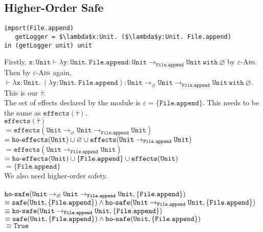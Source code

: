 \documentclass{llncs}
\newcommand{\keywadj}[1]{\mathtt{#1}}
\newcommand{\keyw}[1]{\keywadj{#1}~}
\newcommand{\kw}[1]{\keyw{ #1 }}
\newcommand{\kwa}[1]{\keywadj{ #1 }}
\newcommand{\hyphen}{\hbox{-}}
\newcommand{\Unit}[0]{ \kwa{Unit} }
\begin{document}
\subsection{Higher-Order Safe}
\begin{lstlisting}
import(File.append)
   getLogger = $\lambda$x:Unit. ($\lambda$y:Unit. File.append)
in (getLogger unit) unit
\end{lstlisting}

\noindent
Firstly, $\kwa{x:Unit \vdash \lambda y:Unit .~File.append : \Unit \rightarrow_{File.append} \Unit ~with ~ \varnothing} $ by \textsc{$\varepsilon$-Abs}. Then by \textsc{$\varepsilon$-Abs} again, $\kwa{\vdash \lambda x:Unit.~(\lambda y:Unit.~File.append): Unit \rightarrow_{\varnothing} Unit \rightarrow_{File.append} Unit}~\kw{with} \varnothing$. This is our $\hat \tau$. \\

\noindent
The set of effects declared by the module is $\varepsilon = \{ \kwa{File.append} \}$. This needs to be the same as $\kwa{effects}(\hat \tau)$. \\

\noindent
$\kwa{effects}(\hat \tau)$ \\
$= \kwa{effects}(\kwa{Unit \rightarrow_{\varnothing} Unit \rightarrow_{File.append} Unit})$ \\
$ = \kwa{ho \hyphen effects(Unit) \cup \varnothing \cup \kwa{effects}(Unit \rightarrow_{File.append} Unit)}$ \\
$ = \kwa{effects(Unit \rightarrow_{File.append} Unit)}$ \\
$ = \kwa{ho \hyphen effects(Unit) \cup \{ File.append \} \cup effects(Unit)}$ \\
$ = \{ \kwa{File.append} \}$\\

\noindent
We also need higher-order safety.\\\\
$\kwa{ho \hyphen safe(Unit \rightarrow_{\varnothing} Unit \rightarrow_{File.append} Unit, \{ File.append \})}$\\
$\kwa{\equiv safe(Unit, \{ File.append \}) \land ho \hyphen safe(Unit \rightarrow_{File.append} Unit, \{ File.append \})}$ \\
$\kwa{\equiv ho \hyphen safe(Unit \rightarrow_{File.append} Unit, \{ File.append \})}$ \\
$\equiv \kwa{safe(Unit, \{ File.append \}) \land ho \hyphen safe(Unit, \{ File.append \})}$ \\
$\equiv \kwa{True}$\\
\end{document}
